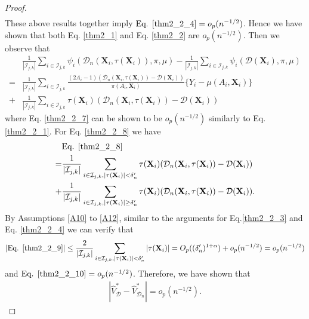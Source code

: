\documentclass[11pt]{article}
\theoremstyle{referenceplain}
\theoremstyle{referencedefinition}
\theoremstyle{referenceremark}
\begin{document}
\begin{proof}
\begin{align*}
    \end{align*}
These above results together imply $\text{Eq. }\eqref{thm2_2_4}=o_p(n^{-1/2})$.
Hence we have shown that both Eq. \eqref{thm2_1} and Eq. \eqref{thm2_2} are $o_p(n^{-1/2})$. Then we observe that
    \begin{align}
        &\frac{1}{|\mathcal{I}_{j,k}|}\sum_{i\in\mathcal{I}_{j,k}}\psi_i(\mathcal{D}_n(\mathbf{X}_i,\tau(\mathbf{X}_i)),\pi,\mu)-\frac{1}{|\mathcal{I}_{j,k}|}\sum_{i\in\mathcal{I}_{j,k}}\psi_i(\mathcal{D}(\mathbf{X}_i),\pi,\mu)\label{thm2_3}\\
        =&\frac{1}{|\mathcal{I}_{j,k}|}\sum_{i\in\mathcal{I}_{j,k}}\frac{(2A_i-1)(\mathcal{D}_n(\mathbf{X}_i,\tau(\mathbf{X}_i))-\mathcal{D}(\mathbf{X}_i))}{\pi(A_i,\mathbf{X}_i)}\{Y_i-\mu(A_i,\mathbf{X}_i)\}\label{thm2_2_7}\\
        +&\frac{1}{|\mathcal{I}_{j,k}|}\sum_{i\in\mathcal{I}_{j,k}}\tau(\mathbf{X}_i)(\mathcal{D}_n(\mathbf{X}_i,\tau(\mathbf{X}_i))-\mathcal{D}(\mathbf{X}_i))\label{thm2_2_8}
    \end{align}
    where Eq. \eqref{thm2_2_7} can be shown to be $o_p(n^{-1/2})$ similarly to Eq. \eqref{thm2_2_1}. For Eq. \eqref{thm2_2_8} we have 
    \begin{align}
        &\text{Eq. }\eqref{thm2_2_8}\notag\\
        =&\frac{1}{|\mathcal{I}_{j,k}|}\sum_{i\in\mathcal{I}_{j,k},|\tau(\mathbf{X}_i)|<\delta_n'}\tau(\mathbf{X}_i)(\mathcal{D}_n(\mathbf{X}_i,\tau(\mathbf{X}_i))-\mathcal{D}(\mathbf{X}_i))\label{thm2_2_9}\\
        +&\frac{1}{|\mathcal{I}_{j,k}|}\sum_{i\in\mathcal{I}_{j,k},|\tau(\mathbf{X}_i)|\ge\delta_n'}\tau(\mathbf{X}_i)(\mathcal{D}_n(\mathbf{X}_i,\tau(\mathbf{X}_i))-\mathcal{D}(\mathbf{X}_i)).\label{thm2_2_10}
    \end{align}
      By Assumptions \ref{A10} to \ref{A12}, similar to the arguments for Eq.\eqref{thm2_2_3} and Eq. \eqref{thm2_2_4} we can verify that
    \begin{align*}
         |\text{Eq. }\eqref{thm2_2_9}|\leq \frac{2}{|\mathcal{I}_{j,k}|}\sum_{i\in\mathcal{I}_{j,k},|\tau(\mathbf{X}_i)|<\delta_n'}|\tau(\mathbf{X}_i)|=O_p((\delta_n')^{1+\alpha})+o_p(n^{-1/2})=o_p(n^{-1/2})
    \end{align*}
    and $\text{Eq. }\eqref{thm2_2_10}=o_p(n^{-1/2})$. Therefore, we have shown that
    \begin{align*}
        |\widehat{V}_{\mathcal{D}}^*-\widehat{V}_{\mathcal{D}_n}^*|=o_p(n^{-1/2}).
    \end{align*}

\end{proof}
\end{document}
